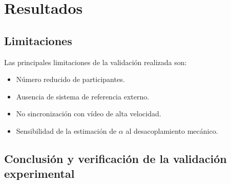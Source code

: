 \renewcommand{\tablename}{Tabla} 


\section{Resultados}

\subsection{Limitaciones}

Las principales limitaciones de la validación realizada son:

\begin{itemize}
    \item Número reducido de participantes.
    \item Ausencia de sistema de referencia externo.
    \item No sincronización con vídeo de alta velocidad.
    \item Sensibilidad de la estimación de $\alpha$ al desacoplamiento mecánico.
\end{itemize}

\subsection{Conclusión y verificación de la validación experimental}



